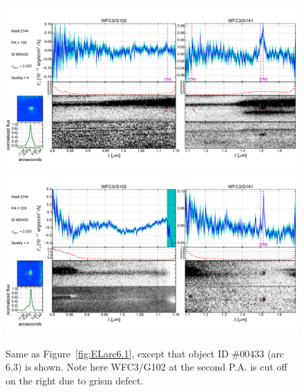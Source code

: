 \begin{figure}
    \centering
    \includegraphics[width=\textwidth]{fig/clA2744_id433_pa135_zsQ4.pdf}\\
    \includegraphics[width=\textwidth]{fig/clA2744_id433_pa233_zsQ4.pdf}
    \caption[Same as Figure~\ref{fig:ELarc6.1}, except that object ID \#00433 (arc 6.3) is shown.]{Same as
    Figure~\ref{fig:ELarc6.1}, except that object ID \#00433 (arc 6.3) is shown. Note here WFC3/G102 at the
    second P.A. is cut off on the right due to grism defect.}
    \label{fig:ELarc6.3}
\end{figure}

